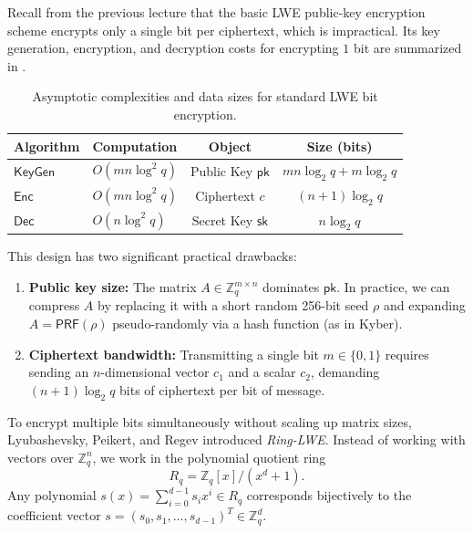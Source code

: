 
Recall from the previous lecture that the basic LWE public-key encryption scheme encrypts only a single bit per ciphertext, which is impractical.
Its key generation, encryption, and decryption costs for encrypting \(1\) bit are summarized in .

\begin{table}[htbp]
    \centering
    \small
    \begin{tabular}{@{}llcc@{}}
        \toprule
        \textbf{Algorithm} & \textbf{Computation} & \textbf{Object} & \textbf{Size (bits)} \\
        \midrule
        \(\mathsf{KeyGen}\) & \(O(m n \log^2 q)\) & Public Key \(\mathsf{pk}\) & \(m n \log_2 q + m \log_2 q\) \\
        \(\mathsf{Enc}\)    & \(O(m n \log^2 q)\) & Ciphertext \(c\)       & \((n + 1) \log_2 q\) \\
        \(\mathsf{Dec}\)    & \(O(n \log^2 q)\)   & Secret Key \(\mathsf{sk}\) & \(n \log_2 q\) \\
        \bottomrule
    \end{tabular}
    \caption{Asymptotic complexities and data sizes for standard LWE bit encryption.}
    \label{tab:lwe-efficiency}
\end{table}

This design has two significant practical drawbacks:
\begin{enumerate}
    \item \textbf{Public key size:} The matrix \(A \in \mathbb{Z}_q^{m \times n}\) dominates \(\mathsf{pk}\). In practice, we can compress \(A\) by replacing it with a short random 256-bit seed \(\rho\) and expanding \(A = \mathsf{PRF}(\rho)\) pseudo-randomly via a hash function (as in Kyber).
    \item \textbf{Ciphertext bandwidth:} Transmitting a single bit \(m \in \{0, 1\}\) requires sending an \(n\)-dimensional vector \(c_1\) and a scalar \(c_2\), demanding \((n + 1) \log_2 q\) bits of ciphertext per bit of message.
\end{enumerate}

To encrypt multiple bits simultaneously without scaling up matrix sizes, Lyubashevsky, Peikert, and Regev introduced \emph{Ring-LWE}.
Instead of working with vectors over \(\mathbb{Z}_q^n\), we work in the polynomial quotient ring
\[
    R_q = \mathbb{Z}_q[x] / (x^d + 1).
\]
Any polynomial \(s(x) = \sum_{i=0}^{d-1} s_i x^i \in R_q\) corresponds bijectively to the coefficient vector \(s = (s_0, s_1, \dots, s_{d-1})^T \in \mathbb{Z}_q^d\).

